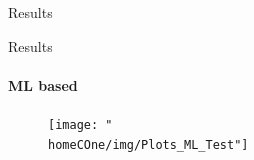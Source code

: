 \documentclass[usenames,dvipsnames]{beamer} %
\newcommand{\homeCOne}{../../Chapter 1 - Metalabeling/Draft}
\begin{document}
\begin{frame}{Results}
\end{frame}

\begin{frame}{Results}
\framesubtitle{ML based}

	\vspace{-.1cm}
	\begin{figure}
		\centering
		\texttt{[image: "\\homeCOne/img/Plots\_ML\_Test"]}
	\end{figure}	

	\vspace{-.35cm}	
%
%	
	


\end{frame}
\end{document}
